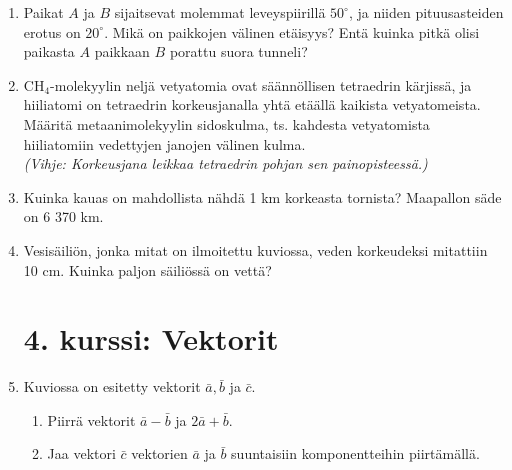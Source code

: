 \documentclass[12pt,fleqn]{article}
\begin{document}
\begin{enumerate}[label=\textbf{\arabic*.}]

\item Paikat \(A\) ja \(B\) sijaitsevat molemmat leveyspiirillä \(50^{\circ}\), ja niiden pituusasteiden erotus on \(20^{\circ}\). Mikä on paikkojen välinen etäisyys? Entä kuinka pitkä olisi paikasta \(A\) paikkaan \(B\) porattu suora tunneli?

\item \(\mathrm{CH}_4\)-molekyylin neljä vetyatomia ovat säännöllisen tetraedrin kärjissä, ja hiiliatomi on tetraedrin korkeusjanalla yhtä etäällä kaikista vetyatomeista. Määritä metaanimolekyylin sidoskulma, ts. kahdesta vetyatomista hiiliatomiin vedettyjen janojen välinen kulma.\\
\emph{(Vihje: Korkeusjana leikkaa tetraedrin pohjan sen painopisteessä.)}
\item Kuinka kauas on mahdollista nähdä 1 km korkeasta tornista? Maapallon säde on 6 370 km.

\item Vesisäiliön, jonka mitat on ilmoitettu kuviossa, veden korkeudeksi mitattiin 10 cm. Kuinka paljon säiliössä on vettä?
\newpage
\section*{4. kurssi: Vektorit}

\item Kuviossa on esitetty vektorit \(\bar{a}, \bar{b}\) ja \(\bar{c}\).

\begin{enumerate}[label=\textbf{\alph*)}]
\item Piirrä vektorit \(\bar{a}-\bar{b}\) ja \(2\bar{a}+\bar{b}\).
\item Jaa vektori \(\bar{c}\) vektorien \(\bar{a}\) ja \(\bar{b}\) suuntaisiin komponentteihin piirtämällä.
\end{enumerate}


\end{enumerate}
\end{document}
